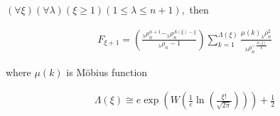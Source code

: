\begin{theorem}
      \((\forall \xi)(\forall \lambda)(\xi 
      \geq 1)(1 \leq \lambda \leq n+1),\) then
      
      \begin{align}
            F_{\xi+1}=\left(\frac{_\lambda \rho_n^{n+1}-_\lambda
            \rho_n^{\Lambda(\xi)-\xi}}{_\lambda \rho_n-1}\right)
                  \sum_{k=1}^{\Lambda(\xi)}\frac{\mu(k)_\lambda\rho_n^2
            }{_\lambda\rho_n^{-\frac{\Lambda(\xi)}{k}}}
      \end{align}
      
      where \(\mu(k)\) is Möbius function
      
      \begin{align}
            \Lambda(\xi) \cong e \exp{\left(W\left(
            \frac{1}{e}\ln\left(\frac{\xi!}{\sqrt{2
            \pi}}\right)\right)\right)}+\frac{1}{2}
      \end{align}
\end{theorem}
